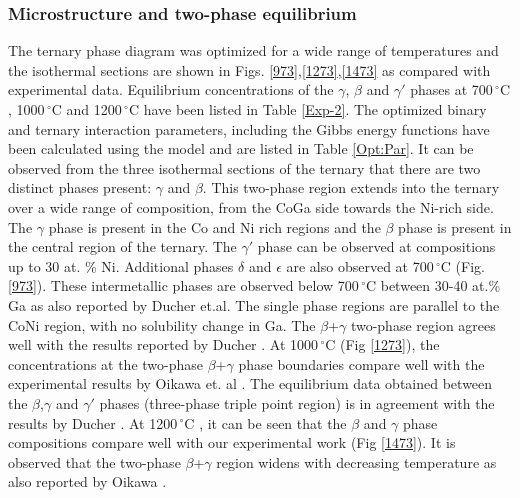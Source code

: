 \documentclass[article]{elsarticle}
\begin{document}
\subsubsection{Microstructure and two-phase equilibrium}
The ternary phase diagram was optimized for a wide range of temperatures and the isothermal sections
are shown in Figs. \ref{973},\ref{1273},\ref{1473} as compared with experimental data.
Equilibrium concentrations of the $\gamma$, $\beta$ and $\gamma'$ phases at
700$\,^{\circ}\mathrm{C}$, 1000$\,^{\circ}\mathrm{C}$ and 1200$\,^{\circ}\mathrm{C}$
have been listed in Table \ref{Exp-2}. The optimized binary and ternary interaction parameters,
including the Gibbs energy functions have been calculated using the model and are listed in Table \ref{Opt:Par}.
It can be observed from the three isothermal sections of the ternary that there are
two distinct phases present: $\gamma$ and $\beta$. This two-phase region extends into
the ternary over a wide range of composition, from the CoGa side towards the Ni-rich side.
The $\gamma$ phase is present in the Co and Ni rich regions and the $\beta$ phase is present
in the central region of the ternary. The $\gamma'$ phase can be observed at compositions
up to 30 at. \% Ni. Additional phases $\delta$ and $\epsilon$ are also observed at
700$\,^{\circ}\mathrm{C}$ (Fig. \ref{973}). These intermetallic phases are observed
below 700$\,^{\circ}\mathrm{C}$ between 30-40 at.\% Ga as also reported by
Ducher et.al\cite{Duch08}. The single phase regions are parallel to the CoNi region,
with no solubility change in Ga. The $\beta$+$\gamma$ two-phase region agrees well
with the results reported by Ducher \cite{Duch08}. At 1000$\,^{\circ}\mathrm{C}$
(Fig \ref{1273}), the concentrations at the two-phase $\beta$+$\gamma$ phase boundaries
compare well with the experimental results by Oikawa et. al \cite{Oik06,Oik01}.
The equilibrium data obtained between the $\beta$,$\gamma$ and $\gamma'$ phases
(three-phase triple point region) is in agreement with the results by Ducher
\cite{Duch08}. At 1200$\,^{\circ}\mathrm{C}$ , it can be seen that the $\beta$
and $\gamma$ phase compositions compare well with our experimental work (Fig \ref{1473}).
It is observed that the two-phase $\beta$+$\gamma$ region widens with decreasing
temperature as also reported by Oikawa \cite{Oik06,Oik01}.
\end{document}
